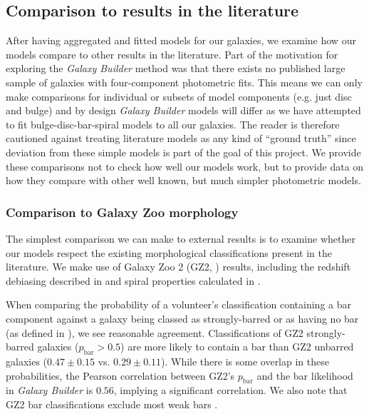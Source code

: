 \documentclass[trackchanges]{aastex63}
\begin{document}
\subsection{Comparison to results in the literature}

After having aggregated and fitted models for our galaxies, we examine how our models compare to other results in the literature. Part of the motivation for exploring the \textit{Galaxy Builder} method was that there exists no published large sample of galaxies with four-component photometric fits. This means we can only make comparisons for individual or subsets of model components (e.g. just disc and bulge) and by design \textit{Galaxy Builder} models will differ as we have attempted to fit bulge-disc-bar-spiral models to all our galaxies. The reader is therefore cautioned against treating literature models as any kind of ``ground truth'' since deviation from these simple models is part of the goal of this project. We provide these comparisons not to check how well our models work, but to provide data on how they compare with other well known, but much simpler photometric models.

\subsubsection{Comparison to Galaxy Zoo morphology}

The simplest comparison we can make to external results is to examine whether our models respect the existing morphological classifications present in the literature. We make use of Galaxy Zoo 2 (GZ2, \citealt{Willett2013:1308.3496v2}) results, including the redshift debiasing described in \citet{Hart2016:1607.01019v1} and spiral properties calculated in \citet{Hart2016:1607.01019v1}.

When comparing the probability of a volunteer's classification containing a bar component against a galaxy being classed as strongly-barred or as having no bar (as defined in \citealt{Masters2010:1003.0449v2}), we see reasonable agreement. Classifications of GZ2 strongly-barred galaxies ($p_\text{bar} > 0.5$) are more likely to contain a bar than GZ2 unbarred galaxies ($0.47 \pm 0.15$ vs. $0.29 \pm 0.11$). While there is some overlap in these probabilities, the Pearson correlation between GZ2's $p_\text{bar}$ and the bar likelihood in \textit{Galaxy Builder} is $0.56$, implying a significant correlation. We also note that GZ2 bar classifications exclude most weak bars \citep{2017MNRAS.469.3363K}.
\end{document}
